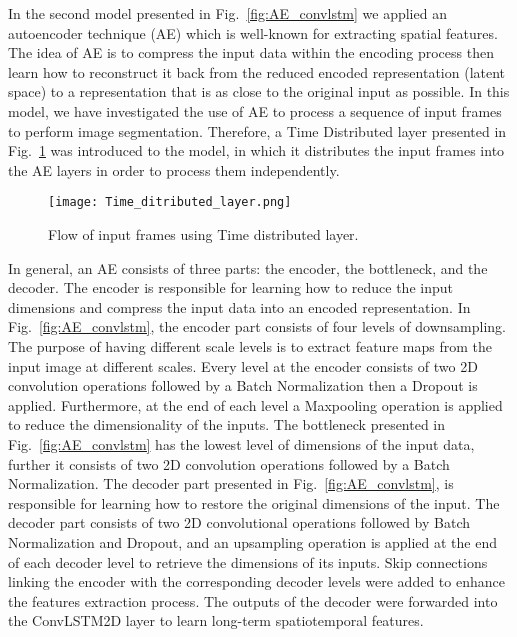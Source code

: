 In the second model presented in Fig.~\ref{fig:AE_convlstm} we applied an autoencoder technique (AE) which is well-known for extracting spatial features.
The idea of AE is to compress the input data within the encoding process then learn how to reconstruct it back from the reduced encoded representation (latent space) to a representation that is as close to the original input as possible. 
In this model, we have investigated the use of AE to process a sequence of input frames to perform image segmentation.
Therefore, a Time Distributed layer presented in Fig.~\ref{fig:TD} was introduced to the model, in which it distributes the input frames into the AE layers in order to process them independently.
\begin{figure}[!h]
	\centering
	\texttt{[image: Time\_ditributed\_layer.png]}
	\caption{Flow of input frames using Time distributed layer.}
	\label{fig:TD}
\end{figure}

In general, an AE consists of three parts: the encoder, the bottleneck, and the decoder.
The encoder is responsible for learning how to reduce the input dimensions and compress the input data into an encoded representation.
In Fig.~\ref{fig:AE_convlstm}, the encoder part consists of four levels of downsampling. 
The purpose of having different scale levels is to extract feature maps from the input image at different scales.
Every level at the encoder consists of two 2D convolution operations followed by a Batch Normalization then a Dropout is applied. 
Furthermore, at the end of each level a Maxpooling operation is applied to reduce the dimensionality of the inputs. 
The bottleneck presented in Fig.~\ref{fig:AE_convlstm} has the lowest level of dimensions of the input data, further it consists of two 2D convolution operations followed by a Batch Normalization.
The decoder part presented in Fig.~\ref{fig:AE_convlstm}, is responsible for learning how to restore the original dimensions of the input.
The decoder part consists of two 2D convolutional operations followed by Batch Normalization and Dropout, and an upsampling operation is applied at the end of each decoder level to retrieve the dimensions of its inputs.
Skip connections linking the encoder with the corresponding decoder levels were added to enhance the features extraction process.
The outputs of the decoder were forwarded into the ConvLSTM2D layer to learn long-term spatiotemporal features.

